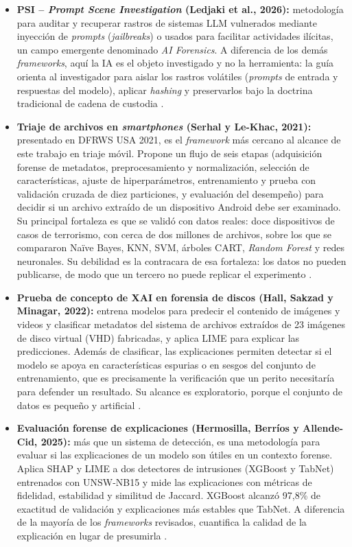 \documentclass[journal]{IEEEtran}
\begin{document}
\begin{itemize}
    \item \textbf{PSI -- \textit{Prompt Scene Investigation} (Ledjaki et al., 2026):} metodología para auditar y recuperar rastros de sistemas LLM vulnerados mediante inyección de \textit{prompts} (\textit{jailbreaks}) o usados para facilitar actividades ilícitas, un campo emergente denominado \textit{AI Forensics}. A diferencia de los demás \textit{frameworks}, aquí la IA es el objeto investigado y no la herramienta: la guía orienta al investigador para aislar los rastros volátiles (\textit{prompts} de entrada y respuestas del modelo), aplicar \textit{hashing} y preservarlos bajo la doctrina tradicional de cadena de custodia \cite{10.1145/3774905.3795469}.
    \item \textbf{Triaje de archivos en \textit{smartphones} (Serhal y Le-Khac, 2021):} presentado en DFRWS USA 2021, es el \textit{framework} más cercano al alcance de este trabajo en triaje móvil. Propone un flujo de seis etapas (adquisición forense de metadatos, preprocesamiento y normalización, selección de características, ajuste de hiperparámetros, entrenamiento y prueba con validación cruzada de diez particiones, y evaluación del desempeño) para decidir si un archivo extraído de un dispositivo Android debe ser examinado. Su principal fortaleza es que se validó con datos reales: doce dispositivos de casos de terrorismo, con cerca de dos millones de archivos, sobre los que se compararon Naïve Bayes, KNN, SVM, árboles CART, \textit{Random Forest} y redes neuronales. Su debilidad es la contracara de esa fortaleza: los datos no pueden publicarse, de modo que un tercero no puede replicar el experimento \cite{SerhalCezar2021Mlba}.
    \item \textbf{Prueba de concepto de XAI en forensia de discos (Hall, Sakzad y Minagar, 2022):} entrena modelos para predecir el contenido de imágenes y videos y clasificar metadatos del sistema de archivos extraídos de 23 imágenes de disco virtual (VHD) fabricadas, y aplica LIME para explicar las predicciones. Además de clasificar, las explicaciones permiten detectar si el modelo se apoya en características espurias o en sesgos del conjunto de entrenamiento, que es precisamente la verificación que un perito necesitaría para defender un resultado. Su alcance es exploratorio, porque el conjunto de datos es pequeño y artificial \cite{HallStuartW.2022APoC}.
    \item \textbf{Evaluación forense de explicaciones (Hermosilla, Berríos y Allende-Cid, 2025):} más que un sistema de detección, es una metodología para evaluar si las explicaciones de un modelo son útiles en un contexto forense. Aplica SHAP y LIME a dos detectores de intrusiones (XGBoost y TabNet) entrenados con UNSW-NB15 y mide las explicaciones con métricas de fidelidad, estabilidad y similitud de Jaccard. XGBoost alcanzó 97,8\% de exactitud de validación y explicaciones más estables que TabNet. A diferencia de la mayoría de los \textit{frameworks} revisados, cuantifica la calidad de la explicación en lugar de presumirla \cite{HermosillaPamela2025EAfF, HermosillaPamela2025UoEA}.

\end{itemize}
\end{document}
